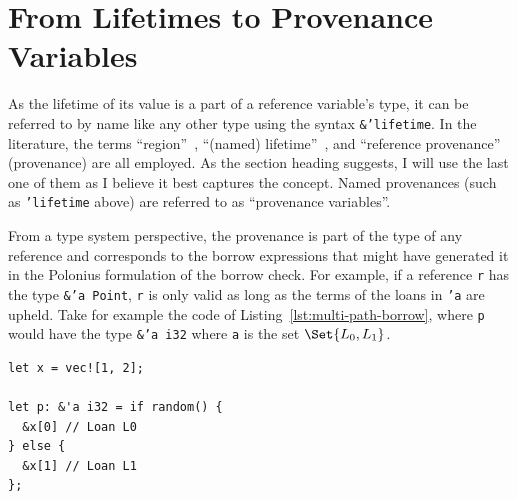 \documentclass[11pt,a4paper,twoside,openany]{report}
\newcommand{\fixme}[1] {{\color{red}#1}}
\newenvironment{sourcecode}{\captionsetup{type=listing}}{}
\newcommand{\InRust}[1]{\texttt{#1}}
\begin{document}

\section{From Lifetimes to Provenance Variables}
\label{sec:reference-provenance}

As the lifetime of its value is a part of a reference variable's type, it can be
referred to by name like any other type using the syntax \InRust{&'lifetime}. In
the literature, the terms ``region''~\cite{matsakis_alias-based_2018}, ``(named)
lifetime''~\nocite{noauthor_rfc_2019}, and ``reference
provenance''~\cite{weiss_oxide:_2019} (provenance) are all employed. As the
section heading suggests, I will use the last one of them as I believe it best
captures the concept. Named provenances (such as \InRust{'lifetime} above) are
referred to as ``provenance variables''.

From a type system perspective, the provenance is part of the type of any
reference and corresponds to the borrow expressions that might have generated it
in the Polonius formulation of the borrow check. For example, if a reference
\InRust{r} has the type \InRust{&'a Point}, \InRust{r} is only valid as long as
the terms of the loans in \InRust{'a} are upheld. Take for example the code of
Listing~\ref{lst:multi-path-borrow}, where \InRust{p} would have the type
\InRust{&'a i32} where \InRust{a} is the set $\Set{L_0, L_1}$.

\begin{sourcecode}
  \label{lst:multi-path-borrow}
\begin{verbatim}
let x = vec![1, 2];

let p: &'a i32 = if random() {
  &x[0] // Loan L0
} else {
  &x[1] // Loan L1
};
\end{verbatim}
\end{sourcecode}
\end{document}
